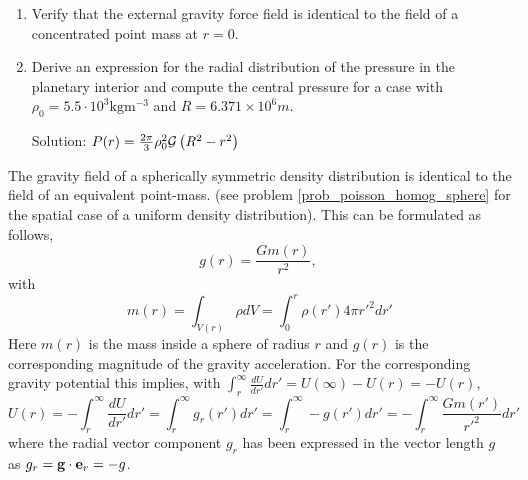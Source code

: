 {\begin{minipage}{0.9\textwidth}
\begin{problem}
{\begin{enumerate}
    \begin{equation}
       g_{ext} = \frac{{\cal G}M}{r^2} ~,~~~
       U_{ext} =   -\frac{{\cal G}M}{r}
       \label{grav_field_unif_sphere}
    \end{equation}
\item
    Verify that the external gravity force field is identical to the field of a
    concentrated point mass at $r=0$.
\item
    Derive an expression for the radial distribution of the pressure in the planetary
    interior and compute the central pressure for a case with 
    $\rho_0 = 5.5 \cdot 10^3 \mathrm{kg m^{-3}}$ and
    $R = 6.371 \times 10^6 m$.

    Solution: $P(r) = \frac{2\pi}{3} \rho_0^2 {\cal G} \left ( R^2 - r^2 \right )$

\end{enumerate}
}
\end{problem}
\end{minipage}
}

\vspace{0.5cm}

The gravity field of a spherically symmetric density
distribution is identical
to the field of an equivalent point-mass.
(see problem \ref{prob_poisson_homog_sphere}  for the spatial case of a uniform density distribution).
This can be formulated as follows,
\begin{equation}
  g(r) =   \frac{Gm(r)}{r^2},~
\label{def_equiv_mass1}
\end{equation}
with 
\begin{equation}
  m(r) =   \int_{V(r)} \rho dV = 
           \int_0^r \rho(r') 4\pi r'^2 dr'
\label{def_equiv_mass2}
\end{equation}
Here $m(r)$ is the mass inside a sphere of radius $r$ and $g(r)$ is 
the corresponding magnitude of the gravity acceleration.
For the corresponding gravity potential this implies, with
$
\int_r^{\infty} \frac{dU}{dr'} dr' = U(\infty) - U(r) = - U(r)
$,
\begin{equation}
 U(r) = - \int_r^{\infty} \frac{dU}{dr'} dr'
      = \int_r^{\infty} g_r(r') dr'
      = \int_r^{\infty} - g(r') dr'
      = - \int_r^{\infty} \frac{Gm(r')}{r'^2} dr'
\label{equiv_potential}
\end{equation}
where the radial vector component $g_r$ has been expressed in the vector length 
$g$ as $g_r= {\bf g} \cdot {\bf e}_r= - g$.


